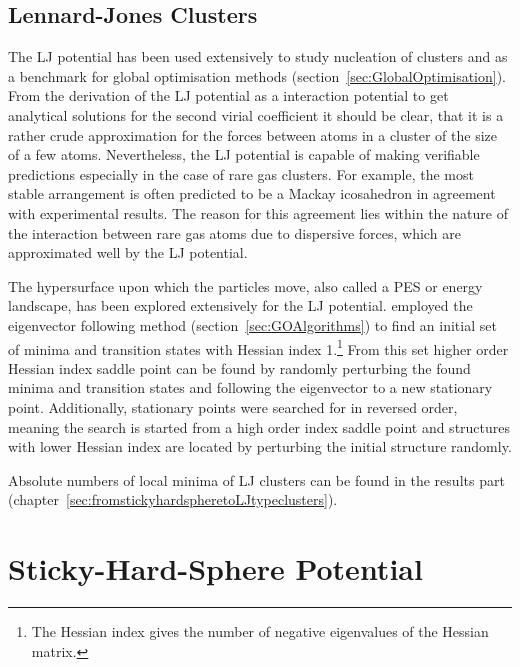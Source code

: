 \subsection{Lennard-Jones Clusters}
\label{sec:LJClusters}

The \ac{LJ} potential has been used extensively to study nucleation of clusters
and as a benchmark for global optimisation methods
(section~\ref{sec:GlobalOptimisation}). From the derivation of the \ac{LJ}
potential as a interaction potential to get analytical solutions for the second
virial coefficient it should be clear, that it is a rather crude approximation
for the forces between atoms in a cluster of the size of a few atoms.
Nevertheless, the \ac{LJ} potential is capable of making verifiable predictions
especially in the case of rare gas
clusters.\autocite{Wales_Energylandscapes_2003} For example, the most stable
arrangement is often predicted to be a Mackay icosahedron in agreement with
experimental results.\autocite{Kakar_SizedependentKedgeEXAFS_1997} The reason
for this agreement lies within the nature of the interaction between rare gas
atoms due to dispersive forces, which are approximated well by the \ac{LJ}
potential.

The hypersurface upon which the particles move, also called a \ac{PES} or energy
landscape, has been explored extensively for the \ac{LJ} potential.
\autocite{Tsai_Useeigenmodemethod_1993,Ball_Dynamicsstatisticalsamples_1999,Doye_Saddlepointsdynamics_2002} \citeauthor{Doye_Saddlepointsdynamics_2002}\autocite{Doye_Saddlepointsdynamics_2002}
employed the eigenvector following method (section~\ref{sec:GOAlgorithms}) to
find an initial set of minima and transition states with Hessian index
1.\footnote{The Hessian index gives the number of negative eigenvalues of the
Hessian matrix.} From this set higher order Hessian index saddle point can be
found by randomly perturbing the found minima and transition states and
following the eigenvector to a new stationary point. Additionally, stationary
points were searched for in reversed order, meaning the search is started from a
high order index saddle point and structures with lower Hessian index are
located by perturbing the initial structure randomly.

Absolute numbers of local minima of \ac{LJ} clusters can be found in the results
part (chapter~\ref{sec:fromstickyhardspheretoLJtypeclusters}).

\section{Sticky-Hard-Sphere Potential}
\label{sec:SHS}

